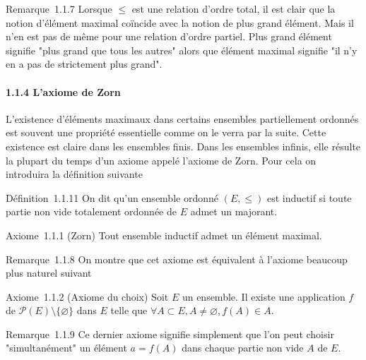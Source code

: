 Remarque~1.1.7 Lorsque $\leqslant$ est une relation d'ordre total, il est clair
que la notion d'élément maximal coïncide avec la notion de plus grand
élément. Mais il n'en est pas de même pour une relation d'ordre partiel.
Plus grand élément signifie "plus grand que tous les autres" alors que
élément maximal signifie "il n'y en a pas de strictement plus grand".

\paragraph{1.1.4 L'axiome de Zorn}

L'existence d'éléments maximaux dans certains ensembles partiellement
ordonnés est souvent une propriété essentielle comme on le verra par la
suite. Cette existence est claire dans les ensembles finis. Dans les
ensembles infinis, elle résulte la plupart du temps d'un axiome appelé
l'axiome de Zorn. Pour cela on introduira la définition suivante

Définition~1.1.11 On dit qu'un ensemble ordonné $(E,\leqslant)$ est inductif si
toute partie non vide totalement ordonnée de $E$ admet un majorant.

Axiome~1.1.1 (Zorn) Tout ensemble inductif admet un élément maximal.

Remarque~1.1.8 On montre que cet axiome est équivalent à l'axiome
beaucoup plus naturel suivant

Axiome~1.1.2 (Axiome du choix) Soit $E$ un ensemble. Il existe une
application $f$ de $\mathscr{P}(E) \setminus \{\varnothing\}$ dans $E$
telle que $\forall A \subset E, A \neq \varnothing, f(A) \in A$.

Remarque~1.1.9 Ce dernier axiome signifie simplement que l'on peut
choisir "simultanément" un élément $a = f(A)$ dans chaque partie non
vide $A$ de $E$.